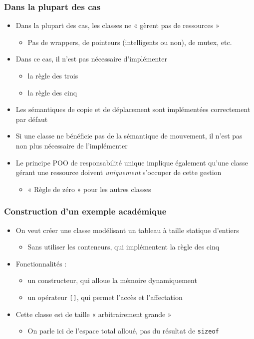 \begin{frame}
\frametitle{Dans la plupart des cas}
\begin{itemize}[<+->]
\item Dans la plupart des cas, les classes ne « gèrent pas de ressources »
	\begin{itemize}
	\item Pas de wrappers, de pointeurs (intelligents ou non), de mutex, etc.
	\end{itemize}
\item Dans ce cas, il n'est pas nécessaire d'implémenter
	\begin{itemize}
	\item la règle des trois
	\item la règle des cinq
	\end{itemize}
\item Les sémantiques de copie et de déplacement sont implémentées correctement par défaut
\item Si une classe ne bénéficie pas de la sémantique de mouvement, il n'est pas non plus nécessaire de l'implémenter
\item Le principe POO de responsabilité unique implique également qu'une classe gérant une ressource doivent \emph{uniquement} s'occuper de cette gestion
	\begin{itemize}
	\item « Règle de zéro » pour les autres classes
	\end{itemize}
\end{itemize}
\end{frame}

\begin{frame}
\frametitle{Construction d'un exemple académique}
\begin{itemize}
\item On veut créer une classe modélisant un tableau à taille statique d'entiers
	\begin{itemize}
	\item Sans utiliser les conteneurs, qui implémentent la règle des cinq
	\end{itemize}
\item Fonctionnalités :
	\begin{itemize}
	\item un constructeur, qui alloue la mémoire dynamiquement
	\item un opérateur \texttt{[]}, qui permet l'accès et l'affectation	
	\end{itemize}
\item Cette classe est de taille « arbitrairement grande »
	\begin{itemize}
	\item On parle ici de l'espace total alloué, pas du résultat de \lstinline|sizeof|
	\end{itemize}
\end{itemize}
\end{frame}

